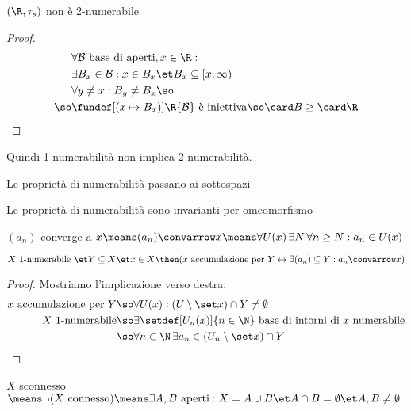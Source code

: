 \begin{prop}
$(\R,\tau_s)$ non è 2-numerabile
\end{prop}
\begin{proof}
\begin{align*}
&\forall\mathcal B\text{ base di aperti},x\in\R:\\
&\exists B_x\in\mathcal B:x\in B_x\et B_x\subseteq [x;\infty)\\
&\forall y\neq x:B_y\neq B_x\so\\
\so&\fundef[(x\mapsto B_x)]\R{\mathcal B}\text{ è iniettiva}\so\card B\geq\card\R
\end{align*}
\end{proof}

\begin{oss}
Quindi 1-numerabilità non implica 2-numerabilità.
\end{oss}

\begin{prop}
Le proprietà di numerabilità passano ai sottospazi
\end{prop}

\begin{prop}
Le proprietà di numerabilità sono invarianti per omeomorfismo
\end{prop}

\begin{defn}[Convergenza]
$(a_n)$ converge a $x\means(a_n)\convarrow x\means\forall U(x)\,\exists N\,\forall n\geq N:a_n\in U(x)$
\end{defn}

\begin{prop}
$X\text{ 1-numerabile }\et Y\subseteq X\et x\in X\then(x\text{ accumulazione per }Y\leftrightarrow\exists(a_n)\subseteq Y:a_n\convarrow x)$
\end{prop}
\begin{proof}
Mostriamo l'implicazione verso destra:
\begin{align*}
x\text{ accumulazione per }Y\so&\forall U(x):(U\setminus\set x)\cap Y\neq\emptyset\\
X\text{ 1-numerabile}\so&\exists\setdef[U_n(x)]{n\in\N}\text{ base di intorni di }x\text{ numerabile}\\
\so&\forall n\in\N\,\exists a_n\in(U_n\setminus\set x)\cap Y
\end{align*}
\end{proof}

\begin{defn}[Connessione]
$X$ sconnesso $\means\neg(X\text{ connesso})\means\exists A,B\text{ aperti}:X=A\cup B\et A\cap B=\emptyset\et A,B\neq\emptyset$
\end{defn}


